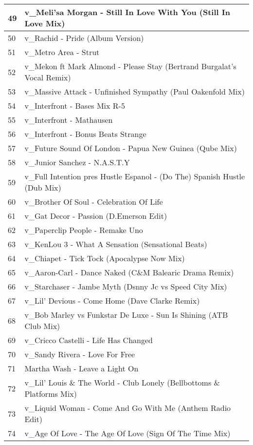 \begin{appendices}
\begin{longtable}{| p{} | p{} |}
\hline
49 & v{\_}Meli'sa Morgan - Still In Love With You (Still In Love Mix)\\
\hline
50 & v{\_}Rachid - Pride (Album Version)\\
\hline
51 & v{\_}Metro Area - Strut\\
\hline
52 & v{\_}Mekon ft Mark Almond - Please Stay (Bertrand Burgalat's Vocal Remix)\\
\hline
53 & v{\_}Massive Attack - Unfinished Sympathy (Paul Oakenfold Mix)\\
\hline
54 & v{\_}Interfront - Bases Mix R-5\\
\hline
55 & v{\_}Interfront - Mathausen\\
\hline 
56 & v{\_}Interfront - Bonus Beats Strange\\
\hline
57 & v{\_}Future Sound Of London - Papua New Guinea (Qube Mix)\\
\hline 
58 & v{\_}Junior Sanchez - N.A.S.T.Y\\
\hline
59 & v{\_}Full Intention pres Hustle Espanol - (Do The) Spanish Hustle (Dub Mix)\\
\hline
60 & v{\_}Brother Of Soul - Celebration Of Life\\
\hline
61 & v{\_}Gat Decor - Passion (D.Emerson Edit)\\
\hline 
62 & v{\_}Paperclip People - Remake Uno\\
\hline 
63 & v{\_}KenLou 3 - What A Sensation (Sensational Beats)\\
\hline
64 & v{\_}Chiapet - Tick Tock (Apocalypse Now Mix)\\
\hline
65 & v{\_}Aaron-Carl - Dance Naked (C{\&}M Balearic Drama Remix)\\
\hline
66 & v{\_}Starchaser - Jambe Myth (Dsnny Jc vs Speed City Mix)\\
\hline
67 & v{\_}Lil' Devious - Come Home (Dave Clarke Remix)\\
\hline 
68 & v{\_}Bob Marley vs Funkstar De Luxe - Sun Is Shining (ATB Club Mix)\\
\hline
69 & v{\_}Cricco Castelli - Life Has Changed\\
\hline
70 & v{\_}Sandy Rivera - Love For Free\\
\hline
71 & Martha Wash - Leave a Light On\\
\hline
72 & v{\_}Lil' Louis {\&} The World - Club Lonely (Bellbottoms {\&} Platforms Mix)\\
\hline
73 & v{\_}Liquid Woman - Come And Go With Me (Anthem Radio Edit)\\
\hline
74 & v{\_}Age Of Love - The Age Of Love (Sign Of The Time Mix)\\

\end{longtable}
\end{appendices}

